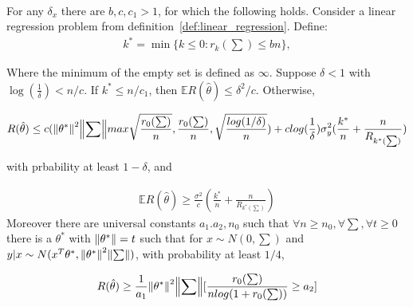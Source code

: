 \documentclass[a4paper,12pt]{scrartcl}
\theoremstyle{definition}
\begin{document}
\begin{thm}\ \\
	For any $\delta_x$ there are $b,c,c_1 > 1$, for which the following holds. Consider a linear regression problem from definition~\ref{def:linear_regression}. Define:
\begin{equation}
\begin{aligned}
k^* = \min \{k \leq 0: r_k(\sum) \leq bn\},
\end{aligned}
\end{equation}

Where the minimum of the empty set is defined as $\infty$. Suppose $\delta < 1$ with $\log(\frac{1}{\delta}) < n/c$. If $k^* \leq n/c_1$, then $\mathbb{E}R(\hat{\theta}) \leq \delta^2/c.$ Otherwise,

\begin{equation}
\begin{aligned}
R(\hat{\theta}) \leq c(\norm{\theta^*}^2\norm{\sum}max{\sqrt{\frac{r_0(\sum)}{n}},\frac{r_0(\sum)}{n},\sqrt{\frac{log(1/\delta)}{n}}}) + clog(\frac{1}{\delta})\sigma_y^2(\frac{k^*}{n} + \frac{n}{R_{k^*(\sum)}}) \\
\end{aligned}
\end{equation}

with prbability at least $1 - \delta$, and 

\begin{equation}
\begin{aligned}
\mathbb{E}R(\hat{\theta}) \geq \frac{\sigma^2}{c} (\frac{k^*}{n} + \frac{n}{R_{k^*(\sum)}}) 
\end{aligned}
\end{equation}
Moreover there are universal constants $a_1.a_2,n_0$ such that $\forall n \geq n_0, \forall \sum, \forall t \geq 0$ there is a $\theta^*$ with $\norm{\theta^*} = t$ such that for $x \sim N(0,\sum)$ and $y|x \sim N(x^T\theta^*,\norm{\theta^*}^2\norm{\sum})$, with probability at least $1/4$,

\begin{equation}
\begin{aligned}
R(\hat{\theta})\geq \frac{1}{a_1}\norm{\theta^*}^2\norm{\sum}[\frac{r_0(\sum)}{nlog(1+r_0(\sum))} \geq a_2]
\end{aligned}
\end{equation}
 
\end{thm}
\end{document}
